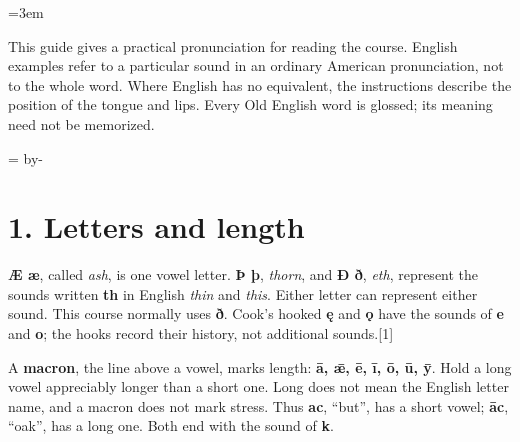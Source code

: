 \BookRecto
\begingroup
\renewcommand{\runningtitle}{Pronunciation}
\emergencystretch=3em
\newcommand{\reserve}[1]{\par\penalty-100\begingroup\dimen0=\pagegoal\advance\dimen0 by-\pagetotal\ifdim\dimen0<#1\newpage\fi\endgroup}
\newcommand{\itempara}[2]{\par\addvspace{3pt}\begingroup\raggedright\noindent\hangindent=1.8em\hangafter=1\makebox[1.8em][l]{#1.}#2\par\endgroup}

\raggedright
{}

This guide gives a practical pronunciation for reading the course. English examples refer to a particular sound in an ordinary American pronunciation, not to the whole word. Where English has no equivalent, the instructions describe the position of the tongue and lips. Every Old English word is glossed; its meaning need not be memorized.

\reserve{4\baselineskip}
\section*{1. Letters and length}

\textbf{Æ æ}, called \emph{ash}, is one vowel letter. \textbf{Þ þ}, \emph{thorn}, and \textbf{Ð ð}, \emph{eth}, represent the sounds written \textbf{th} in English \emph{thin} and \emph{this}. Either letter can represent either sound. This course normally uses \textbf{ð}. Cook's hooked \textbf{ę} and \textbf{ǫ} have the sounds of \textbf{e} and \textbf{o}; the hooks record their history, not additional sounds.[1]

A \textbf{macron}, the line above a vowel, marks length: \textbf{ā, ǣ, ē, ī, ō, ū, ȳ}. Hold a long vowel appreciably longer than a short one. Long does not mean the English letter name, and a macron does not mark stress. Thus \textbf{ac}, “but”, has a short vowel; \textbf{āc}, “oak”, has a long one. Both end with the sound of \textbf{k}.

